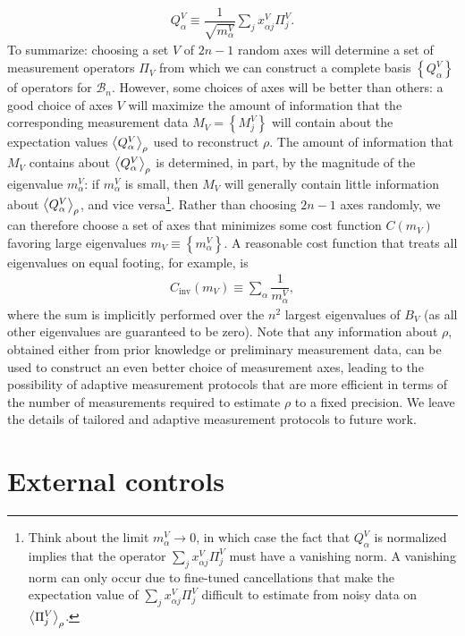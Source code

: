 \documentclass[nofootinbib,notitlepage,11pt]{revtex4-2}
\renewcommand{\t}{\text} %
\newcommand{\f}[2]{\dfrac{#1}{#2}} %
\newcommand{\p}[1]{\left(#1\right)} %
\renewcommand{\set}[1]{\left\{#1\right\}} %
\newcommand{\bk}{\Braket} %
\newcommand{\1}{\mathds{1}}
\newcommand{\B}{\mathcal{B}}
\begin{document}
\begin{align}
  Q^V_\alpha \equiv \f1{\sqrt{m^V_\alpha}} \sum_j x^V_{\alpha j} \Pi^V_j.
\end{align}
To summarize: choosing a set $V$ of $2n-1$ random axes will determine a set of measurement operators $\Pi_V$ from which we can construct a complete basis $\set{Q^V_\alpha}$ of operators for $\B_n$.
However, some choices of axes will be better than others: a good choice of axes $V$ will maximize the amount of information that the corresponding measurement data $M_V=\set{M^V_j}$ will contain about the expectation values $\bk{Q^V_\alpha}_\rho$ used to reconstruct $\rho$.
The amount of information that $M_V$ contains about $\bk{Q^V_\alpha}_\rho$ is determined, in part, by the magnitude of the eigenvalue $m^V_\alpha$: if $m^V_\alpha$ is small, then $M_V$ will generally contain little information about $\bk{Q^V_\alpha}_\rho$, and vice versa\footnote{Think about the limit $m^V_\alpha\to0$, in which case the fact that $Q^V_\alpha$ is normalized implies that the operator $\sum_j x^V_{\alpha j} \Pi^V_j$ must have a vanishing norm.
  A vanishing norm can only occur due to fine-tuned cancellations that make the expectation value of $\sum_j x^V_{\alpha j} \Pi^V_j$ difficult to estimate from noisy data on $\bk{\Pi^V_j}_\rho$.}.
Rather than choosing $2n-1$ axes randomly, we can therefore choose a set of axes that minimizes some cost function $C\p{m_V}$ favoring large eigenvalues $m_V\equiv\set{m^V_\alpha}$.
A reasonable cost function that treats all eigenvalues on equal footing, for example, is
\begin{align}
  C_{\t{inv}}\p{m_V} \equiv \sum_\alpha \f1{m^V_\alpha},
\end{align}
where the sum is implicitly performed over the $n^2$ largest eigenvalues of $B_V$ (as all other eigenvalues are guaranteed to be zero).
Note that any information about $\rho$, obtained either from prior knowledge or preliminary measurement data, can be used to construct an even better choice of measurement axes, leading to the possibility of adaptive measurement protocols \cite{pereira2018adaptive} that are more efficient in terms of the number of measurements required to estimate $\rho$ to a fixed precision.
We leave the details of tailored and adaptive measurement protocols to future work.

\section{External controls}
\label{sec:controls}
\end{document}
